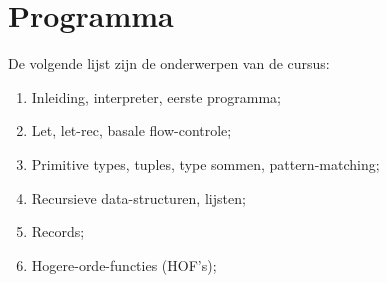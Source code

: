 \section{Programma}
	De volgende lijst zijn de onderwerpen van de cursus:
	\begin{enumerate}
		\item Inleiding, interpreter, eerste programma;
		\item Let, let-rec, basale flow-controle;
		\item Primitive types, tuples, type sommen, pattern-matching;
		\item Recursieve data-structuren, lijsten;
		\item Records;
		\item Hogere-orde-functies (HOF's);
	\end{enumerate}
\ \\

